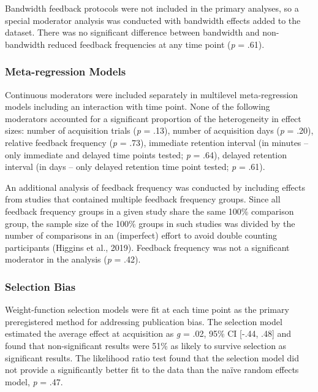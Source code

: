 \documentclass[
  english,
  man,mask,floatsintext]{apa7}
\begin{document}
Bandwidth feedback protocols were not included in the primary analyses, so a special moderator analysis was conducted with bandwidth effects added to the dataset. There was no significant difference between bandwidth and non-bandwidth reduced feedback frequencies at any time point (\emph{p} = .61).

\hypertarget{meta-regression-models}{%
\subsubsection{Meta-regression Models}\label{meta-regression-models}}

Continuous moderators were included separately in multilevel meta-regression models including an interaction with time point. None of the following moderators accounted for a significant proportion of the heterogeneity in effect sizes: number of acquisition trials (\emph{p} = .13), number of acquisition days (\emph{p} = .20), relative feedback frequency (\emph{p} = .73), immediate retention interval (in minutes -- only immediate and delayed time points tested; \emph{p} = .64), delayed retention interval (in days -- only delayed retention time point tested; \emph{p} = .61).

An additional analysis of feedback frequency was conducted by including effects from studies that contained multiple feedback frequency groups. Since all feedback frequency groups in a given study share the same 100\% comparison group, the sample size of the 100\% groups in such studies was divided by the number of comparisons in an (imperfect) effort to avoid double counting participants (Higgins et al., 2019). Feedback frequency was not a significant moderator in the analysis (\emph{p} = .42).

\hypertarget{selection-bias}{%
\subsubsection{Selection Bias}\label{selection-bias}}

Weight-function selection models were fit at each time point as the primary preregistered method for addressing publication bias. The selection model estimated the average effect at acquisition as \emph{g} = .02, 95\% CI {[}-.44, .48{]} and found that non-significant results were 51\% as likely to survive selection as significant results. The likelihood ratio test found that the selection model did not provide a significantly better fit to the data than the naïve random effects model, \emph{p} = .47.
\end{document}
